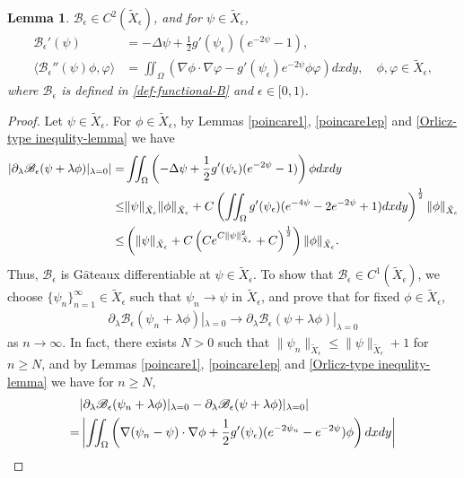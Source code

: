 \documentclass[1 [leqno, 11pt]{amsart}
\numberwithin{equation}{section}
\let\ep=\epsilon
\newtheorem{lemma}[Theorem]{Lemma}
\begin{document}
\begin{CJK*}{GBK}{song}
\begin{lemma}\label{B-C2}
$\mathscr{B}_\ep\in C^2(\tilde X_\ep)$, and for $ \psi\in \tilde X_\ep$,
\begin{align*}
\mathscr{B}_\ep'(\psi) &= -\Delta\psi +\frac{1}{2}g'(\psi_\ep)(e^{-2\psi}-1),\\
\langle \mathscr{B}_\ep''(\psi)\phi,\varphi \rangle&=  \iint_{\Omega}\left(\nabla\phi\cdot\nabla\varphi- g'(\psi_\ep) e^{-2\psi}\phi\varphi\right)dxdy,\quad \phi,\varphi\in\tilde X_\ep,
\end{align*}
 where   $\mathscr{B}_\ep$ is defined in \eqref{def-functional-B} and $\ep\in[0,1)$.
\end{lemma}
\begin{proof}
Let $\psi\in \tilde{X}_\ep$. For  $\phi \in \tilde{X}_\ep$, by Lemmas \ref{poincare1}, \ref{poincare1ep} and \ref{Orlicz-type inequlity-lemma} we have
\begin{align*}
|\partial_\lambda \mathscr{B}_\ep(\psi + \lambda \phi)|_{\lambda = 0}|
= & \iint_\Omega  \left(-\Delta \psi+{1\over2}  g'(\psi_\ep) (e^{-2\psi}-1)\right)\phi dxdy\\
\leq &\|\psi\|_{\tilde{X}_\ep}\|\phi\|_{\tilde{X}_\ep}+ C \left(\iint_\Omega    g'(\psi_\ep) (e^{-4\psi}-2e^{-2\psi}+1)dxdy\right)^{1\over2}\|\phi \|_{\tilde{X}_\ep}\\
\leq &\left(\|\psi\|_{\tilde{X}_\ep}+ C \left(Ce^{C\|\psi\|_{\tilde{X}_\ep}^2}+C\right)^{1\over2}\right)\|\phi \|_{\tilde{X}_\ep}.
\end{align*}
Thus,  $\mathscr{B}_\ep$  is G$\hat{\text{a}}$teaux differentiable at $\psi\in  \tilde{X}_\ep$.
To show that $\mathscr{B}_\ep\in C^1(\tilde X_\ep)$, we choose $\{\psi_n\}_{n=1}^\infty\in \tilde X_\ep$ such that $\psi_n\to\psi$ in $\tilde{X}_\ep$, and prove that for fixed $\phi\in\tilde X_\ep$,
\begin{align*}
\partial_\lambda \mathscr{B}_\ep(\psi_n + \lambda \phi)|_{\lambda = 0}\to\partial_\lambda \mathscr{B}_\ep(\psi + \lambda \phi)|_{\lambda = 0}
\end{align*}
as $n\to\infty$.
In fact, there exists $N>0$ such that $\|\psi_n\|_{\tilde X_\ep}\leq \|\psi\|_{\tilde X_\ep}+1$ for $n\geq N$, and  by Lemmas \ref{poincare1}, \ref{poincare1ep} and \ref{Orlicz-type inequlity-lemma} we have for $n\geq N$,
\begin{align*}
&|\partial_\lambda \mathscr{B}_\ep(\psi_n + \lambda \phi)|_{\lambda = 0}-\partial_\lambda \mathscr{B}_\ep(\psi + \lambda \phi)|_{\lambda = 0}| \\
= & \left|\iint_{\Omega}\left(\nabla(\psi_n-\psi)\cdot\nabla\phi +{1\over 2} g'(\psi_\ep)(e^{-2\psi_n} - e^{-2\psi})\phi\right) dxdy\right|\\

\end{align*}
\end{proof}
\end{CJK*}
\end{document}
